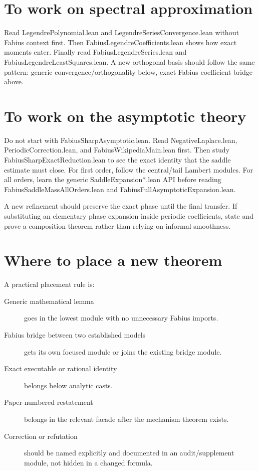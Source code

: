 \documentclass[11pt,a4paper,openany]{book}
\def\module#1{#1.lean}
\newcommand{\module}[1]{\nolinkurl{#1.lean}}
\begin{document}
\section{To work on spectral approximation}
Read \module{LegendrePolynomial} and
\module{LegendreSeriesConvergence} without Fabius context first.  Then
\module{FabiusLegendreCoefficients} shows how exact moments enter.  Finally
read \module{FabiusLegendreSeries} and
\module{FabiusLegendreLeastSquares}.  A new orthogonal basis should follow the
same pattern: generic convergence/orthogonality below, exact Fabius coefficient
bridge above.

\section{To work on the asymptotic theory}
\begin{readingpath}
Do not start with \module{FabiusSharpAsymptotic}.  Read
\module{NegativeLaplace}, \module{PeriodicCorrection}, and
\module{FabiusWikipediaMain} first.  Then study
\module{FabiusSharpExactReduction} to see the exact identity that the saddle
estimate must close.  For first order, follow the central/tail Lambert modules.
For all orders, learn the generic \module{SaddleExpansion*} API before reading
\module{FabiusSaddleMassAllOrders} and
\module{FabiusFullAsymptoticExpansion}.
\end{readingpath}
A new refinement should preserve the exact phase until the final transfer.  If
substituting an elementary phase expansion inside periodic coefficients, state
and prove a composition theorem rather than relying on informal smoothness.

\section{Where to place a new theorem}
A practical placement rule is:
\begin{description}
\item[Generic mathematical lemma] goes in the lowest module with no unnecessary
Fabius imports.
\item[Fabius bridge between two established models] gets its own focused module
or joins the existing bridge module.
\item[Exact executable or rational identity] belongs below analytic casts.
\item[Paper-numbered restatement] belongs in the relevant facade after the
mechanism theorem exists.
\item[Correction or refutation] should be named explicitly and documented in
an audit/supplement module, not hidden in a changed formula.
\end{description}
\end{document}
